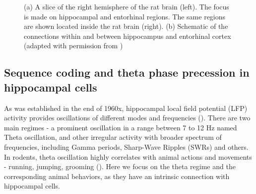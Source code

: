 \begin{figure}
\captionsetup{format=plain}
\caption[HPC Anatomy]{
(a) A slice of the right hemisphere of the rat brain (left). The focus is made on hippocampal and entorhinal regions. The same regions are shown located inside the rat brain (right). (b) Schematic of the connections within and between hippocampus and entorhinal cortex (adapted with permission from \cite{Moser2014})
}
\label{fig:F2_HPC_anatomy}
\end{figure}


\subsection{Sequence coding and theta phase precession in hippocampal cells}

As was established in the end of 1960x, hippocampal local field potential (LFP) activity provides oscillations of different modes and frequencies (\cite{Vanderwolf1969}). There are two main regimes - a prominent oscillation in a range between 7 to 12 Hz named Theta oscillation, and other irregular activity with broader spectrum of frequencies, including Gamma periods, Sharp-Wave Ripples (SWRs) and others. In rodents, theta oscillation highly correlates with animal actions and movements - running, jumping, grooming (\cite{OKeefe1993}). Here we focus on the theta regime and the corresponding animal behaviors, as they have an intrinsic connection with hippocampal cells.


